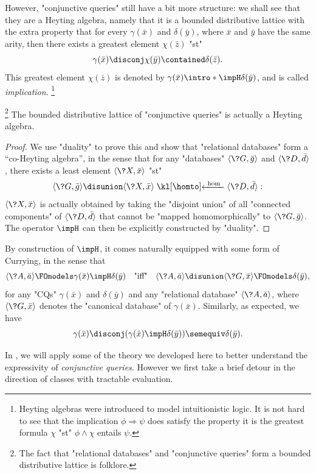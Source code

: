 However, "conjunctive queries" still have a bit more structure: we shall
see that they are a Heyting algebra, namely that it is a bounded distributive lattice
with the extra property that for every $\gamma(\bar x)$ and $\delta(\bar y)$,
where $\bar x$ and $\bar y$ have the same arity, then there exists
a greatest element $\chi(\bar z)$ "st"
\[
	\gamma(\bar x) \disconj \chi(\bar y) \contained \delta(\Bar z). 
\]
This greatest element $\chi(\bar z)$ is denoted by \AP$\gamma(\bar x) \intro*\impH \delta(\bar y)$, and is called \emph{implication}.%
\footnote{Heyting algebras were introduced to model intuitionistic logic.
It is not hard to see that the implication $\phi \Rightarrow \psi$
does satisfy the property it is the greatest formula $\chi$
"st" $\phi \land \chi$ entails $\psi$.}

\begin{proposition}
	\!\footnote{The fact that "relational databases" and "conjunctive queries" form
	a bounded distributive lattice is folklore.}
	The bounded distributive lattice of "conjunctive queries" is actually
	a Heyting algebra.
\end{proposition}

\begin{proof}
	We use "duality" to prove this and show that "relational databases" form a ``co-Heyting algebra'',
	in the sense that for any "databases" $\tup{\?G, \bar g}$ and $\tup{\?D, \bar d}$,
	there exists a least element $\tup{\?X, \bar x}$ "st"
	\[
		\tup{\?G, \bar g} \disunion \tup{\?X, \bar x} \cohomto \tup{\?D, \bar d}:
	\]
	$\tup{\?X, \bar x}$ is actually obtained by taking the "disjoint union"
	of all "connected components" of $\tup{\?D, \bar d}$ 
	that cannot be "mapped homomorphically" to $\tup{\?G, \bar g}$.
	The operator $\impH$ can then be explicitly constructed by "duality".
\end{proof}

By construction of $\impH$, it comes naturally equipped with some
form of Currying, in the sense that
\[
	\tup{\?A, \bar a}
	\FOmodels \gamma(\bar x) \impH \delta(\bar y)
	\quad\text{"iff"}\quad
	\tup{\?A, \bar a} \disunion \tup{\?G, \bar x}
	\FOmodels \delta(\bar y),
\]
for any "CQs" $\gamma(\bar x)$ and $\delta(\bar y)$
and any "relational database" $\tup{\?A, \bar a}$,
where $\tup{\?G, \bar x}$ denotes the "canonical database" of $\gamma(\bar x)$.
Similarly, as expected, we have
\[
	\gamma(\bar x) \disconj (\gamma(\bar x) \impH \delta(\bar y))
	\semequiv
	\delta(\bar y).
\]

In ,
we will apply some of the theory we developed here
to better understand the expressivity of \emph{conjunctive queries}.
However we first take a brief detour in the direction of classes
with tractable evaluation.

